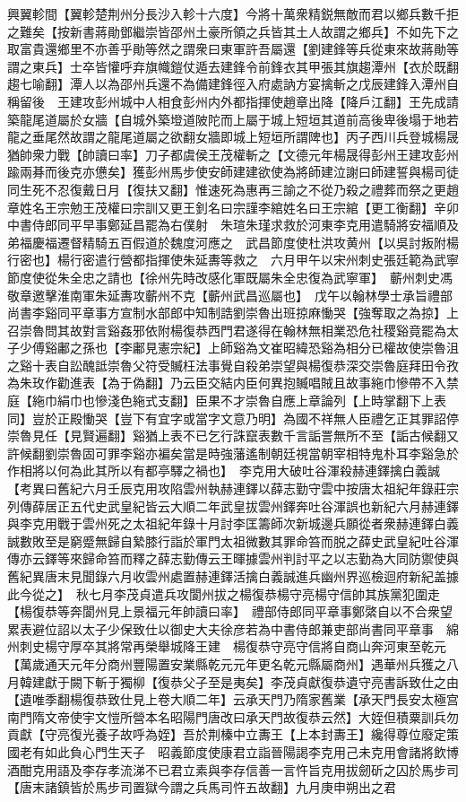 興翼軫間【翼軫楚荆州分長沙入軫十六度】今將十萬衆精鋭無敵而君以鄉兵數千拒之難矣【按新書蔣勛鄧繼崇皆邵州土豪所領之兵皆其土人故謂之鄉兵】不如先下之取富貴還鄉里不亦善乎勛等然之謂衆曰東軍許吾屬還【劉建鋒等兵從東來故蔣勛等謂之東兵】士卒皆懽呼弃旗幟鎧仗遁去建鋒令前鋒衣其甲張其旗趨潭州【衣於既翻趨七喻翻】潭人以為邵州兵還不為備建鋒徑入府處訥方宴擒斬之戊辰建鋒入潭州自稱留後　王建攻彭州城中人相食彭州内外都指揮使趙章出降【降戶江翻】王先成請築龍尾道屬於女牆【自城外築墱道陂陀而上屬于城上短垣其道前高後卑後塌于地若龍之垂尾然故謂之龍尾道屬之欲翻女牆即城上短垣所謂陴也】丙子西川兵登城楊晟猶帥衆力戰【帥讀曰率】刀子都虞侯王茂權斬之【文德元年楊晟得彭州王建攻彭州踰兩朞而後克亦憊矣】獲彭州馬步使安師建建欲使為將師建泣謝曰師建誓與楊司徒同生死不忍復戴日月【復扶又翻】惟速死為惠再三諭之不從乃殺之禮葬而祭之更趙章姓名王宗勉王茂權曰宗訓又更王釗名曰宗謹李綰姓名曰王宗綰【更工衡翻】辛卯中書侍郎同平早事鄭延昌罷為右僕射　朱瑄朱瑾求救於河東李克用遣騎將安福順及弟福慶福遷督精騎五百假道於魏度河應之　武昌節度使杜洪攻黄州【以吳討叛附楊行密也】楊行密遣行營都指揮使朱延夀等救之　六月甲午以宋州刺史張廷範為武寧節度使從朱全忠之請也【徐州先時改感化軍既屬朱全忠復為武寧軍】　蘄州刺史馮敬章邀擊淮南軍朱延夀攻蘄州不克【蘄州武昌巡屬也】　戊午以翰林學士承旨禮部尚書李谿同平章事方宣制水部郎中知制誥劉崇魯出班掠麻慟哭【強奪取之為掠】上召崇魯問其故對言谿姦邪依附楊復恭西門君遂得在翰林無相業恐危社稷谿竟罷為太子少傅谿鄘之孫也【李鄘見憲宗紀】上師谿為文崔昭緯恐谿為相分已權故使崇魯沮之谿十表自訟醜詆崇魯父符受贓枉法事覺自殺弟崇望與楊復恭深交崇魯庭拜田令孜為朱玫作勸進表【為于偽翻】乃云臣交結内臣何異抱贓唱賊且故事絁巾慘帶不入禁庭【絁巾絹巾也慘淺色絁式支翻】臣果不才崇魯自應上章論列【上時掌翻下上表同】豈於正殿慟哭【豈下有宜字或當字文意乃明】為國不祥無人臣禮乞正其罪詔停崇魯見任【見賢遍翻】谿猶上表不已乞行誅竄表數千言詬詈無所不至【詬古候翻又許候翻劉崇魯固可罪李谿亦褊矣當是時強藩遙制朝廷視當朝宰相特鬼朴耳李谿急於作相將以何為此其所以有都亭驛之禍也】　李克用大破吐谷渾殺赫連鐸擒白義誠　【考異曰舊紀六月壬辰克用攻陷雲州執赫連鐸以薛志勤守雲中按唐太祖紀年錄莊宗列傳薛居正五代史武皇紀皆云大順二年武皇拔雲州鐸奔吐谷渾誤也新紀六月赫連鐸與李克用戰于雲州死之太祖紀年錄十月討李匡籌師次新城邊兵願從者衆赫連鐸白義誠數敗至是窮蹙無歸自縶膝行詣於軍門太祖微數其罪命笞而脱之薛史武皇紀吐谷渾傳亦云鐸等來歸命笞而釋之薛志勤傳云王暉據雲州判討平之以志勤為大同防禦使與舊紀異唐末見聞錄六月收雲州處置赫連鐸活擒白義誠進兵幽州界巡檢迴府新紀盖據此今從之】　秋七月李茂貞遣兵攻閬州拔之楊復恭楊守亮楊守信帥其族黨犯圍走【楊復恭等奔閬州見上景福元年帥讀曰率】　禮部侍郎同平章事鄭綮自以不合衆望累表避位詔以太子少保致仕以御史大夫徐彦若為中書侍郎兼吏部尚書同平章事　綿州刺史楊守厚卒其將常再榮舉城降王建　楊復恭守亮守信將自商山奔河東至乾元【萬歲通天元年分商州豐陽置安業縣乾元元年更名乾元縣屬商州】遇華州兵獲之八月韓建獻于闕下斬于獨柳【復恭父子至是夷矣】李茂貞獻復恭遺守亮書訴致仕之由【遺唯季翻楊復恭致仕見上卷大順二年】云承天門乃隋家舊業【承天門長安太極宫南門隋文帝使宇文愷所營本名昭陽門唐改曰承天門故復恭云然】大姪但積粟訓兵勿貢獻【守亮復光養子故呼為姪】吾於荆榛中立夀王【上本封夀王】纔得尊位廢定策國老有如此負心門生天子　昭義節度使康君立詣晉陽謁李克用己未克用會諸將飲博酒酣克用語及李存孝流涕不已君立素與李存信善一言忤旨克用拔劒斫之囚於馬步司【唐末諸鎮皆於馬步司置獄今謂之兵馬司忤五故翻】九月庚申朔出之君